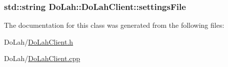 \subsubsection[{settings\+File}]{\setlength{\rightskip}{0pt plus 5cm}std\+::string Do\+Lah\+::\+Do\+Lah\+Client\+::settings\+File\hspace{0.3cm}{\ttfamily [private]}}\label{class_do_lah_1_1_do_lah_client_a65625760378215d86a7578fad09ef779}


The documentation for this class was generated from the following files\+:\begin{DoxyCompactItemize}
\item 
Do\+Lah/\hyperlink{_do_lah_client_8h}{Do\+Lah\+Client.\+h}\item 
Do\+Lah/\hyperlink{_do_lah_client_8cpp}{Do\+Lah\+Client.\+cpp}\end{DoxyCompactItemize}
